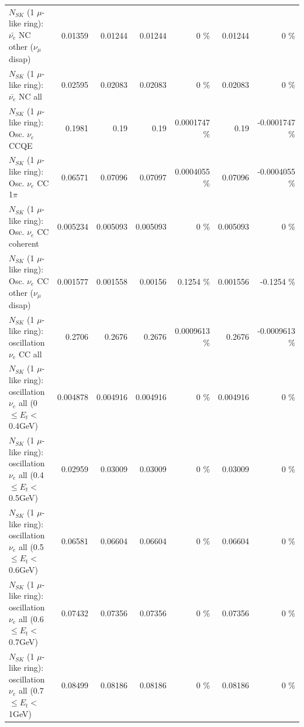 \begin{table}
\begin{tabular}{| l | r | r | r  r | r  r |}
          $N_{SK}$ (1 $\mu$-like ring): $\bar{\nu_e}$ NC other ($\nu_\mu$ disap) &         0.01359 &         0.01244 &         0.01244 &        0 \%  &         0.01244 &        0 \%  \\ 
                            $N_{SK}$ (1 $\mu$-like ring): $\bar{\nu_{e}}$ NC all &         0.02595 &         0.02083 &         0.02083 &        0 \%  &         0.02083 &        0 \%  \\ 
\hline
\hline
\hline
                                 $N_{SK}$ (1 $\mu$-like ring): Osc. $\nu_e$ CCQE &          0.1981 &            0.19 &            0.19 & 0.0001747 \%  &            0.19 & -0.0001747 \%  \\ 
                            $N_{SK}$ (1 $\mu$-like ring): Osc. $\nu_e$ CC 1$\pi$ &         0.06571 &         0.07096 &         0.07097 & 0.0004055 \%  &         0.07096 & -0.0004055 \%  \\ 
                          $N_{SK}$ (1 $\mu$-like ring): Osc. $\nu_e$ CC coherent &        0.005234 &        0.005093 &        0.005093 &        0 \%  &        0.005093 &        0 \%  \\ 
           $N_{SK}$ (1 $\mu$-like ring): Osc. $\nu_e$ CC other ($\nu_\mu$ disap) &        0.001577 &        0.001558 &         0.00156 &   0.1254 \%  &        0.001556 &  -0.1254 \%  \\ 
                        $N_{SK}$ (1 $\mu$-like ring): oscillation $\nu_e$ CC all &          0.2706 &          0.2676 &          0.2676 & 0.0009613 \%  &          0.2676 & -0.0009613 \%  \\ 
\hline
$N_{SK}$ (1 $\mu$-like ring): oscillation $\nu_{e}$ all (0 $\leq E_{t} <$ 0.4GeV) &        0.004878 &        0.004916 &        0.004916 &        0 \%  &        0.004916 &        0 \%  \\ 
$N_{SK}$ (1 $\mu$-like ring): oscillation $\nu_{e}$ all (0.4 $\leq E_{t} <$ 0.5GeV) &         0.02959 &         0.03009 &         0.03009 &        0 \%  &         0.03009 &        0 \%  \\ 
$N_{SK}$ (1 $\mu$-like ring): oscillation $\nu_{e}$ all (0.5 $\leq E_{t} <$ 0.6GeV) &         0.06581 &         0.06604 &         0.06604 &        0 \%  &         0.06604 &        0 \%  \\ 
$N_{SK}$ (1 $\mu$-like ring): oscillation $\nu_{e}$ all (0.6 $\leq E_{t} <$ 0.7GeV) &         0.07432 &         0.07356 &         0.07356 &        0 \%  &         0.07356 &        0 \%  \\ 
$N_{SK}$ (1 $\mu$-like ring): oscillation $\nu_{e}$ all (0.7 $\leq E_{t} <$ 1GeV) &         0.08499 &         0.08186 &         0.08186 &        0 \%  &         0.08186 &        0 \%  \\ 

\end{tabular}
\end{table}
